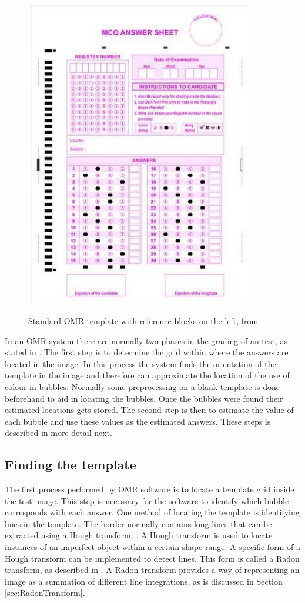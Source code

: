 \begin{figure}
  \centering
  \includegraphics[width=10cm]{omrTemplate}\\
  \caption{Standard OMR template with reference blocks on the left, from \citet{stdTemplate}}
  \label{fig:omrTemplate}
\end{figure}

In an OMR system there are normally two phases in the grading of an test, as stated in \citet{DraganI2003}. The first step is to determine the grid within where the answers are located in the image. In this process the system finds the orientation of the template in the image and therefore can approximate the location of the use of colour in bubbles. Normally some preprocessing on a blank template is done beforehand to aid in locating the bubbles. Once the bubbles were found their estimated locations gets stored. The second step is then to estimate the value of each bubble and use these values as the estimated answers. These steps is described in more detail next.

\subsection{Finding the template}

The first process performed by OMR software is to locate a template grid inside the test image. This step is necessary for the software to identify which bubble corresponds with each answer. One method of locating the template is identifying lines in the template. The border normally contains long lines that can be extracted using a Hough transform, \citet{MVGI2015}. A Hough transform is used to locate instances of an imperfect object within a certain shape range. A specific form of a Hough transform can be implemented to detect lines. This form is called a Radon transform, as described in \citet{MathWorks}. A Radon transform provides a way of representing an image as a summation of different line integrations, as is discussed in Section \ref{sec:RadonTransform}. 

